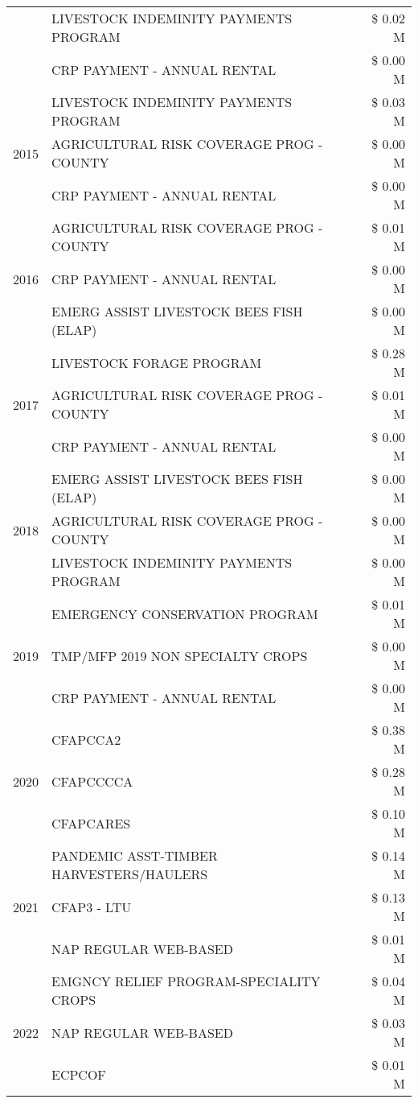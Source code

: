 \begin{tabular}{llr}
 & LIVESTOCK INDEMINITY PAYMENTS PROGRAM & \$ 0.02 M \\
 & CRP PAYMENT - ANNUAL RENTAL & \$ 0.00 M \\
\cline{1-3}
\multirow[t]{3}{*}{2015} & LIVESTOCK INDEMINITY PAYMENTS PROGRAM & \$ 0.03 M \\
 & AGRICULTURAL RISK COVERAGE PROG - COUNTY & \$ 0.00 M \\
 & CRP PAYMENT - ANNUAL RENTAL & \$ 0.00 M \\
\cline{1-3}
\multirow[t]{3}{*}{2016} & AGRICULTURAL RISK COVERAGE PROG - COUNTY & \$ 0.01 M \\
 & CRP PAYMENT - ANNUAL RENTAL & \$ 0.00 M \\
 & EMERG ASSIST LIVESTOCK BEES FISH (ELAP) & \$ 0.00 M \\
\cline{1-3}
\multirow[t]{3}{*}{2017} & LIVESTOCK FORAGE PROGRAM & \$ 0.28 M \\
 & AGRICULTURAL RISK COVERAGE PROG - COUNTY & \$ 0.01 M \\
 & CRP PAYMENT - ANNUAL RENTAL & \$ 0.00 M \\
\cline{1-3}
\multirow[t]{3}{*}{2018} & EMERG ASSIST LIVESTOCK BEES FISH (ELAP) & \$ 0.00 M \\
 & AGRICULTURAL RISK COVERAGE PROG - COUNTY & \$ 0.00 M \\
 & LIVESTOCK INDEMINITY PAYMENTS PROGRAM & \$ 0.00 M \\
\cline{1-3}
\multirow[t]{3}{*}{2019} & EMERGENCY CONSERVATION PROGRAM & \$ 0.01 M \\
 & TMP/MFP 2019 NON SPECIALTY CROPS & \$ 0.00 M \\
 & CRP PAYMENT - ANNUAL RENTAL & \$ 0.00 M \\
\cline{1-3}
\multirow[t]{3}{*}{2020} & CFAPCCA2 & \$ 0.38 M \\
 & CFAPCCCCA & \$ 0.28 M \\
 & CFAPCARES & \$ 0.10 M \\
\cline{1-3}
\multirow[t]{3}{*}{2021} & PANDEMIC ASST-TIMBER HARVESTERS/HAULERS & \$ 0.14 M \\
 & CFAP3 - LTU & \$ 0.13 M \\
 & NAP REGULAR WEB-BASED & \$ 0.01 M \\
\cline{1-3}
\multirow[t]{3}{*}{2022} & EMGNCY RELIEF PROGRAM-SPECIALITY CROPS & \$ 0.04 M \\
 & NAP REGULAR WEB-BASED & \$ 0.03 M \\
 & ECPCOF & \$ 0.01 M \\
\cline{1-3}
\bottomrule
\end{tabular}
